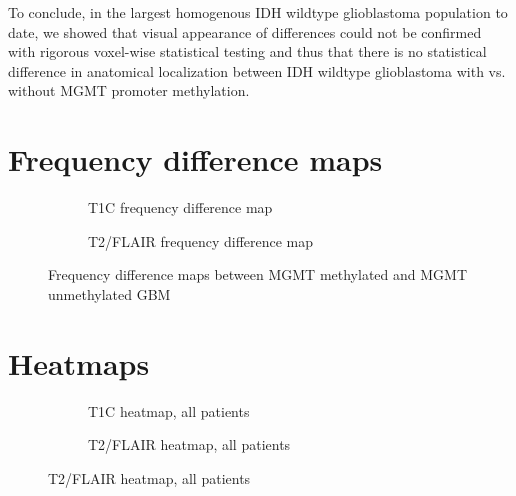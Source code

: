 To conclude, in the largest homogenous \gls{IDH} wildtype glioblastoma population to date, we showed that visual appearance of differences could not be confirmed with rigorous voxel-wise statistical testing and thus that there is no statistical difference in anatomical localization between \gls{IDH} wildtype glioblastoma with vs. without \gls{MGMT} promoter methylation.

\newpage
\begin{subappendices}

    \section{Frequency difference maps}
    \begin{figure}[H]
    \centering
    \begin{subfigure}[t]{0.4\textwidth}
        \centering
        \caption{\gls{T1C} frequency difference map}\label{fig:HGG_loc_T1_freq_dif_gif}
    \end{subfigure}
    \begin{subfigure}[t]{0.4\textwidth}
        \centering
        \caption{\gls{T2}/\gls{FLAIR} frequency difference map}\label{fig:HGG_loc_T2_freq_dif_gif}
    \end{subfigure}
    \caption{Frequency difference maps between \gls{MGMT} methylated and \gls{MGMT} unmethylated \gls{GBM}}
    \end{figure}

    \newpage
    \section{Heatmaps}
    \begin{figure}[H]
        \centering
        \begin{subfigure}[t]{0.4\textwidth}
            \centering
            \caption{\gls{T1C} heatmap, all patients}\label{fig:HGG_loc_T1_heatmap_all}
        \end{subfigure}
        \begin{subfigure}[t]{0.4\textwidth}
            \centering
            \caption{\gls{T2}/\gls{FLAIR} heatmap, all patients}\label{fig:HGG_loc_T2_heatmap_all}
        \end{subfigure}


\end{figure}
\end{subappendices}
